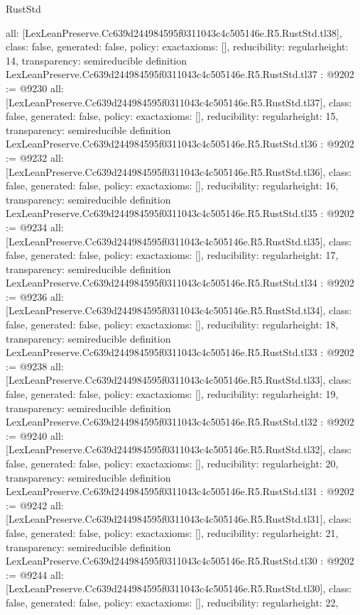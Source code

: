 \begin{lexlean}{RustStd}
\begin{coremodule}
{  all: [LexLeanPreserve.Cc639d244984595f0311043c4c505146e.R5.RustStd.tl38],
  class: false,
  generated: false,
  policy: exact{axioms: []},
  reducibility: regular{height: 14},
  transparency: semireducible
}
definition LexLeanPreserve.Cc639d244984595f0311043c4c505146e.R5.RustStd.tl37 : @9202 := @9230 {
  all: [LexLeanPreserve.Cc639d244984595f0311043c4c505146e.R5.RustStd.tl37],
  class: false,
  generated: false,
  policy: exact{axioms: []},
  reducibility: regular{height: 15},
  transparency: semireducible
}
definition LexLeanPreserve.Cc639d244984595f0311043c4c505146e.R5.RustStd.tl36 : @9202 := @9232 {
  all: [LexLeanPreserve.Cc639d244984595f0311043c4c505146e.R5.RustStd.tl36],
  class: false,
  generated: false,
  policy: exact{axioms: []},
  reducibility: regular{height: 16},
  transparency: semireducible
}
definition LexLeanPreserve.Cc639d244984595f0311043c4c505146e.R5.RustStd.tl35 : @9202 := @9234 {
  all: [LexLeanPreserve.Cc639d244984595f0311043c4c505146e.R5.RustStd.tl35],
  class: false,
  generated: false,
  policy: exact{axioms: []},
  reducibility: regular{height: 17},
  transparency: semireducible
}
definition LexLeanPreserve.Cc639d244984595f0311043c4c505146e.R5.RustStd.tl34 : @9202 := @9236 {
  all: [LexLeanPreserve.Cc639d244984595f0311043c4c505146e.R5.RustStd.tl34],
  class: false,
  generated: false,
  policy: exact{axioms: []},
  reducibility: regular{height: 18},
  transparency: semireducible
}
definition LexLeanPreserve.Cc639d244984595f0311043c4c505146e.R5.RustStd.tl33 : @9202 := @9238 {
  all: [LexLeanPreserve.Cc639d244984595f0311043c4c505146e.R5.RustStd.tl33],
  class: false,
  generated: false,
  policy: exact{axioms: []},
  reducibility: regular{height: 19},
  transparency: semireducible
}
definition LexLeanPreserve.Cc639d244984595f0311043c4c505146e.R5.RustStd.tl32 : @9202 := @9240 {
  all: [LexLeanPreserve.Cc639d244984595f0311043c4c505146e.R5.RustStd.tl32],
  class: false,
  generated: false,
  policy: exact{axioms: []},
  reducibility: regular{height: 20},
  transparency: semireducible
}
definition LexLeanPreserve.Cc639d244984595f0311043c4c505146e.R5.RustStd.tl31 : @9202 := @9242 {
  all: [LexLeanPreserve.Cc639d244984595f0311043c4c505146e.R5.RustStd.tl31],
  class: false,
  generated: false,
  policy: exact{axioms: []},
  reducibility: regular{height: 21},
  transparency: semireducible
}
definition LexLeanPreserve.Cc639d244984595f0311043c4c505146e.R5.RustStd.tl30 : @9202 := @9244 {
  all: [LexLeanPreserve.Cc639d244984595f0311043c4c505146e.R5.RustStd.tl30],
  class: false,
  generated: false,
  policy: exact{axioms: []},
  reducibility: regular{height: 22},
}
\end{coremodule}
\end{lexlean}
